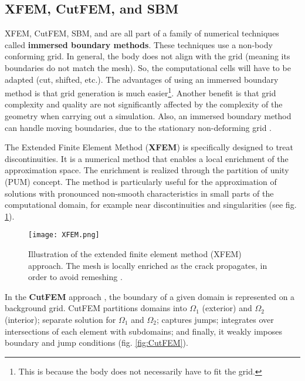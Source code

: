 \subsection{XFEM, CutFEM, and SBM}

XFEM, CutFEM, SBM, and \phifem are all part of a family of numerical techniques called \textbf{immersed boundary methods}. These techniques use a non-body conforming grid. In general, the body does not align with the grid (meaning its boundaries do not match the mesh). So, the computational cells will have to be adapted (cut, shifted, etc.). The advantages of using an immersed boundary method is that grid generation is much easier\footnote{This is because the body does not necessarily have to fit the grid.}. Another benefit is that grid complexity and quality are not significantly affected by the complexity of the geometry when carrying out a simulation. Also, an immersed boundary method can handle moving boundaries, due to the stationary non-deforming grid \parencite{bandringa2010immersed}.

The Extended Finite Element Method (\textbf{XFEM}) \parencite{moes1999finite} is specifically designed to treat discontinuities. It is a numerical method that enables a local enrichment of the approximation space. The enrichment is realized through the partition of unity (PUM) concept. The method is particularly useful for the approximation of solutions with pronounced non-smooth characteristics in small parts of the computational domain, for example near discontinuities and singularities (see fig. \ref{fig:XFEM}).
\begin{figure}[H]
    \centering
    \texttt{[image: XFEM.png]}
    \caption{Illustration of the extended finite element method (XFEM) approach. The mesh is locally enriched as the crack propagates, in order to avoid remeshing \parencite{de2018delamination}.}
    \label{fig:XFEM}
\end{figure}


In the \textbf{CutFEM} approach \parencite{burman2015cutfem}, the boundary of a given domain is represented on a background grid. CutFEM partitions domains into $\Omega_1$ (exterior) and $\Omega_2$ (interior); separate solution for $\Omega_1$ and $\Omega_2$; captures jumps; integrates over intersections of each element with subdomains; and finally, it weakly imposes boundary and jump conditions (fig. \ref{fig:CutFEM}). 

